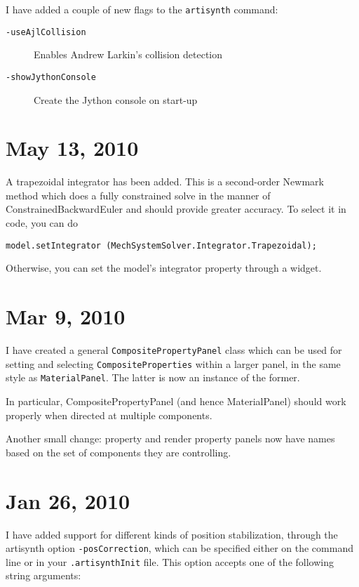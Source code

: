 \documentclass{article}
\begin{document}
I have added a couple of new flags to the {\tt artisynth} command:

\begin{description}

\item[{\tt -useAjlCollision}] \mbox{}
 Enables Andrew Larkin's collision detection

\item[{\tt -showJythonConsole}] \mbox{}
 Create the Jython console on start-up

\end{description}

\section*{May 13, 2010}

A trapezoidal integrator has been added. This is a second-order
Newmark method which does a fully constrained solve in the manner of
ConstrainedBackwardEuler and should provide greater accuracy. To
select it in code, you can do

\begin{lstlisting}
model.setIntegrator (MechSystemSolver.Integrator.Trapezoidal);
\end{lstlisting}

Otherwise, you can set the model's integrator property through a
widget.

\section*{Mar 9, 2010}

I have created a general {\tt CompositePropertyPanel} class which can be
used for setting and selecting {\tt CompositeProperties} within a larger
panel, in the same style as {\tt MaterialPanel}. The latter is now an
instance of the former.

In particular, CompositePropertyPanel (and hence MaterialPanel) should
work properly when directed at multiple components.

Another small change: property and render property panels now have
names based on the set of components they are controlling.

\section*{Jan 26, 2010}

I have added support for different kinds of position stabilization,
through the artisynth option {\tt -posCorrection}, which can be specified
either on the command line or in your {\tt .artisynthInit} file. This
option accepts one of the following string arguments:
\end{document}
